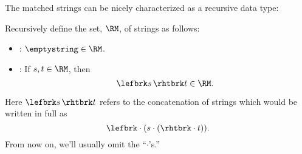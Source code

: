 \iffalse
One precise way to determine if a string is matched is to start with 0 and
read the string from left to right, adding 1 to the count for each left
bracket and subtracting 1 from the count for each right bracket.
For example, here are the counts for the two strings above
\[\begin{array}{rrrrrrrrrrrrr}
& \lefbrk & \rhtbrk & \rhtbrk & \lefbrk & \lefbrk & \lefbrk & \lefbrk &
\lefbrk & \rhtbrk & \rhtbrk & \rhtbrk & \rhtbrk\\
0 & 1 & 0 & -1 & 0 & 1 & 2 & 3 & 4 & 3 & 2 & 1 & 0\\
\\
\\
& \lefbrk & \lefbrk & \lefbrk & \rhtbrk & \rhtbrk & \lefbrk & \rhtbrk &
\rhtbrk & \lefbrk & \rhtbrk\\
0 & 1 & 2 & 3 & 2 & 1 & 2 & 1 & 0 & 1 & 0
\end{array}\]
A string has a \term{good count} if its running count never goes
negative and ends with 0.  So the second string above has a good count, but
the first one does not because its count went negative at the third step.
\begin{definition}\label{gc-def}
Let
\[
\GC \eqdef\  \set{ s \in \brkts \suchthat s\ \text{has a good count}}.
\]
\end{definition}
The matched strings can now be characterized precisely as this set of
strings with good counts.
\fi

The matched strings can be nicely characterized as a recursive data type:

\begin{definition}\label{RM_def}\label{RM-def}
Recursively define the set, $\RM$, of strings as follows:
\begin{itemize}

\item {}: $\emptystring \in\RM$.

\item {}: If $s,t \in\RM$, then
\[
\lefbrk s\, \rhtbrk t \in \RM.
\]
\end{itemize}

\end{definition}

Here $\lefbrk s\, \rhtbrk t$ refers to the concatenation of
strings which would be written in full as
\[
\lefbrk \cdot (s \cdot (\rhtbrk \cdot t)).
\]
From now on, we'll usually omit the ``$\cdot$'s.'' 

